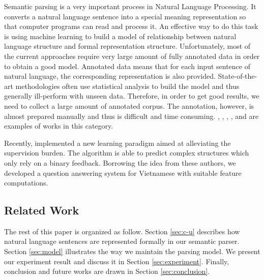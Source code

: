 \label{sec:introduction}

Semantic parsing is a very important process in Natural Language Processing. It converts a natural language sentence into a special meaning representation so that computer programs can read and process it. An effective way to do this task is using machine learning to build a model of relationship between natural language structure and formal representation structure. Unfortunately, most of the current approaches require very large amount of fully annotated data in order to obtain a good model. Annotated data means that for each input sentence of natural language, the corresponding representation is also provided. State-of-the-art methodologies often use statistical analysis to build the model and thus generally ill-perform with unseen data. Therefore, in order to get good results, we need to collect a large amount of annotated corpus. The annotation, however, is almost prepared manually and thus is difficult and time consuming. \cite{Zelle:1996:LPD:1864519.1864543}, \cite{Tang:2001:UMC:645328.650015}, \cite{Zettlemoyer05learningto}, \cite{Ge:2005:SSP:1706543.1706546}, \cite{Zettlemoyer07onlinelearning} and \cite{Wong07learningsynchronous} are examples of works in this category.

Recently, \citeauthor{Clarke:2010:DSP:1870568.1870571} implemented a new learning paradigm aimed at alleviating the supervision burden. The algorithm is able to predict complex structures which only rely on a binary feedback. Borrowing the idea from these authors, we developed a question answering system for Vietnamese with suitable feature computations.

\subsection*{Related Work}


The rest of this paper is organized as follow. Section \ref{sec:c-u} describes how natural language sentences are represented formally in our semantic parser. Section \ref{sec:model} illustrates the way we maintain the parsing model. We present our experiment result and discuss it in Section \ref{sec:experiment}. Finally, conclusion and future works are drawn in Section \ref{sec:conclusion}.